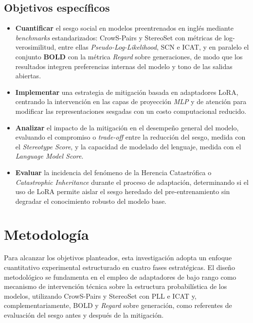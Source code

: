 \documentclass[12pt,a4paper]{report}
\begin{document}
\subsection{Objetivos específicos}
\label{subsec:objetivos_especificos}
\begin{itemize}
    \item \textbf{Cuantificar} el sesgo social en modelos preentrenados en inglés mediante \textit{benchmarks} estandarizados: CrowS-Pairs y StereoSet con métricas de log-verosimilitud, entre ellas \textit{Pseudo-Log-Likelihood}, SCN e ICAT, y en paralelo el conjunto \textbf{BOLD} con la métrica \textit{Regard} sobre generaciones, de modo que los resultados integren preferencias internas del modelo y tono de las salidas abiertas.
    
    \item \textbf{Implementar} una estrategia de mitigación basada en adaptadores LoRA, centrando la intervención en las capas de proyección \textit{MLP} y de atención para modificar las representaciones sesgadas con un costo computacional reducido.
    
    \item \textbf{Analizar} el impacto de la mitigación en el desempeño general del modelo, evaluando el compromiso o \textit{trade-off} entre la reducción del sesgo, medida con el \textit{Stereotype Score}, y la capacidad de modelado del lenguaje, medida con el \textit{Language Model Score}.
    
    \item \textbf{Evaluar} la incidencia del fenómeno de la Herencia Catastrófica o \textit{Catastrophic Inheritance} durante el proceso de adaptación, determinando si el uso de LoRA permite aislar el sesgo heredado del pre-entrenamiento sin degradar el conocimiento robusto del modelo base.
\end{itemize}

\section{Metodología}
\label{sec:metodologia}

Para alcanzar los objetivos planteados, esta investigación adopta un enfoque cuantitativo experimental estructurado en cuatro fases 
estratégicas. El diseño metodológico se fundamenta en el empleo de adaptadores de bajo rango como mecanismo de intervención técnica 
sobre la estructura probabilística de los modelos, utilizando CrowS-Pairs y StereoSet con PLL e ICAT y, complementariamente, BOLD y \textit{Regard} sobre generación, como referentes de evaluación del sesgo antes y después de la mitigación.
\end{document}

